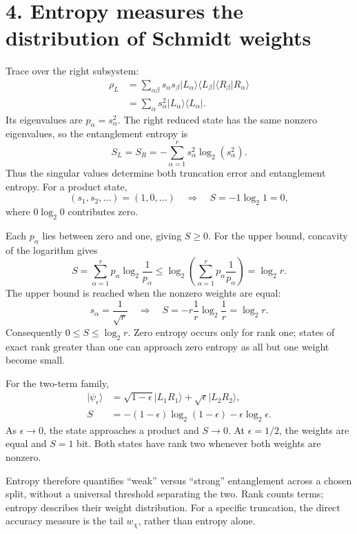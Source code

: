 \documentclass[11pt]{article}
\newcommand{\ket}[1]{\lvert #1\rangle}
\newcommand{\bra}[1]{\langle #1\rvert}
\begin{document}
\section*{4. Entropy measures the distribution of Schmidt weights}
Trace over the right subsystem:
\begin{align}
\rho_L
&=\sum_{\alpha\beta}s_\alpha s_\beta\ket{L_\alpha}\bra{L_\beta}
\langle R_\beta|R_\alpha\rangle\\
&=\sum_\alpha s_\alpha^2\ket{L_\alpha}\bra{L_\alpha}.
\end{align}
Its eigenvalues are $p_\alpha=s_\alpha^2$. The right reduced state has the same nonzero eigenvalues, so the entanglement entropy is
\begin{equation}
\boxed{S_L=S_R=-\sum_{\alpha=1}^r s_\alpha^2\log_2(s_\alpha^2).}
\end{equation}
Thus the singular values determine both truncation error and entanglement entropy. For a product state,
\begin{equation}
(s_1,s_2,\ldots)=(1,0,\ldots)
\quad\Longrightarrow\quad S=-1\log_2 1=0,
\end{equation}
where $0\log_2 0$ contributes zero.

Each $p_\alpha$ lies between zero and one, giving $S\geq0$. For the upper bound, concavity of the logarithm gives
\begin{equation}
S=\sum_{\alpha=1}^r p_\alpha\log_2\frac1{p_\alpha}
\leq\log_2\left(\sum_{\alpha=1}^r p_\alpha\frac1{p_\alpha}\right)
=\log_2 r.
\end{equation}
The upper bound is reached when the nonzero weights are equal:
\begin{equation}
s_\alpha=\frac1{\sqrt r}
\quad\Longrightarrow\quad
S=-r\frac1r\log_2\frac1r=\log_2r.
\end{equation}
Consequently $0\leq S\leq\log_2r$. Zero entropy occurs only for rank one; states of exact rank greater than one can approach zero entropy as all but one weight become small.

For the two-term family,
\begin{align}
\ket{\psi_\epsilon}
&=\sqrt{1-\epsilon}\ket{L_1R_1}+\sqrt\epsilon\ket{L_2R_2},\\
S&=-(1-\epsilon)\log_2(1-\epsilon)-\epsilon\log_2\epsilon.
\end{align}
As $\epsilon\to0$, the state approaches a product and $S\to0$. At $\epsilon=1/2$, the weights are equal and $S=1$ bit. Both states have rank two whenever both weights are nonzero.

Entropy therefore quantifies ``weak'' versus ``strong'' entanglement across a chosen split, without a universal threshold separating the two. Rank counts terms; entropy describes their weight distribution. For a specific truncation, the direct accuracy measure is the tail $w_\chi$, rather than entropy alone.
\end{document}
